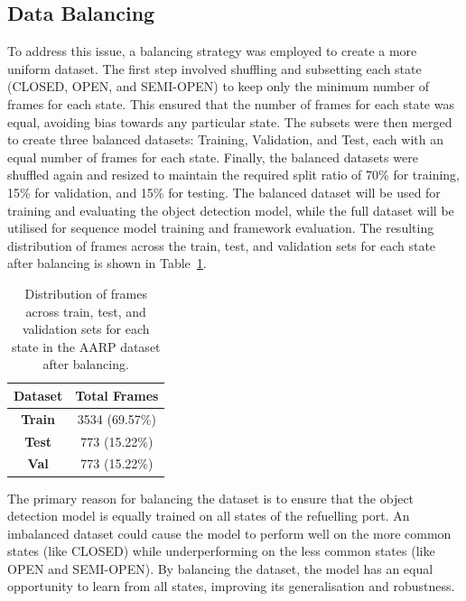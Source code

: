 \documentclass[12pt,oneside]{book} %
\begin{document}
\subsection{Data Balancing}
To address this issue, a balancing strategy was employed to create a more
uniform dataset. The first step involved shuffling and subsetting each state
(CLOSED, OPEN, and SEMI-OPEN) to keep only the minimum number of frames for
each state. This ensured that the number of frames for each state was equal,
avoiding bias towards any particular state. The subsets were then merged to
create three balanced datasets: Training, Validation, and Test, each with an
equal number of frames for each state. Finally, the balanced datasets were
shuffled again and resized to maintain the required split ratio of 70\% for
training, 15\% for validation, and 15\% for testing. The balanced dataset will
be used for training and evaluating the object detection model, while the full
dataset will be utilised for sequence model training and framework evaluation.
The resulting distribution of frames across the train, test, and validation
sets for each state after balancing is shown in
Table~\ref{tab:balanced_frame_distribution}.
\begin{table}[H]
    \centering
    \begin{tabular}{@{}cc@{}}
        \toprule
        \textbf{Dataset} & \textbf{Total Frames} \\ \midrule
        \textbf{Train}   & 3534 (69.57\%)        \\ 
        \textbf{Test}    & 773  (15.22\%)        \\ 
        \textbf{Val}     & 773  (15.22\%)        \\ \bottomrule
    \end{tabular}
    \caption{\centering Distribution of frames across train, test, and validation sets for each state in the AARP dataset after balancing.}
    \label{tab:balanced_frame_distribution}
\end{table}

\noindent The primary reason for balancing the dataset is to ensure that the object
detection model is equally trained on all states of the refuelling port. An
imbalanced dataset could cause the model to perform well on the more common
states (like CLOSED) while underperforming on the less common states (like OPEN
and SEMI-OPEN). By balancing the dataset, the model has an equal opportunity to
learn from all states, improving its generalisation and robustness. 
\end{document}
